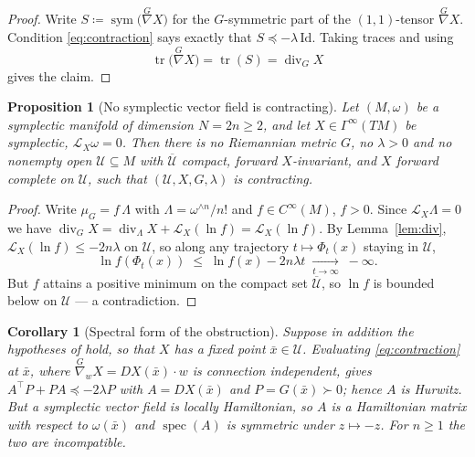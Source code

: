 \documentclass[11pt,a4paper]{article}
\newcommand{\dive}{\operatorname{div}}
\newcommand{\Gsec}[1]{\Gamma^{\infty}(#1)}
\newcommand{\Cinf}[1]{C^{\infty}(#1)}
\newcommand{\id}{\mathrm{Id}}
\newcommand{\Lie}{\mathcal{L}}
\DeclareMathOperator{\spec}{spec}
\DeclareMathOperator{\tr}{tr}
\theoremstyle{plain}
\newtheorem{proposition}[theorem]{Proposition}
\newtheorem{corollary}[theorem]{Corollary}
\theoremstyle{definition}
\theoremstyle{remark}
\begin{document}
\begin{proof}
Write $S \coloneqq \operatorname{sym}\big(\overset{G}{\nabla}X\big)$ for the
$G$-symmetric part of the $(1,1)$-tensor $\overset{G}{\nabla}X$. Condition
\eqref{eq:contraction} says exactly that $S \preceq -\lambda\,\id$. Taking traces
and using
\[
  \tr\big(\overset{G}{\nabla}X\big) = \tr(S) = \dive_G X
\]
gives the claim.
\end{proof}

\begin{proposition}[No symplectic vector field is contracting]
\label{prop:obstruction}
Let $(M,\omega)$ be a symplectic manifold of dimension $N = 2n \ge 2$, and let
$X \in \Gsec{TM}$ be symplectic, $\Lie_X\omega = 0$. Then there is no Riemannian
metric $G$, no $\lambda>0$ and no nonempty open $\mathcal{U} \subseteq M$ with
$\overline{\mathcal{U}}$ compact, forward $X$-invariant, and $X$ forward complete
on $\mathcal{U}$, such that $(\mathcal{U},X,G,\lambda)$ is contracting.
\end{proposition}

\begin{proof}
Write $\mu_G = f\,\Lambda$ with $\Lambda = \omega^{\wedge n}/n!$ and
$f \in \Cinf{M}$, $f>0$. Since $\Lie_X\Lambda = 0$ we have
$\dive_G X = \dive_\Lambda X + \Lie_X(\ln f) = \Lie_X(\ln f)$.
By Lemma~\ref{lem:div}, $\Lie_X(\ln f) \le -2n\lambda$ on $\mathcal{U}$, so along
any trajectory $t \mapsto \Phi_t(x)$ staying in $\mathcal{U}$,
\[
  \ln f(\Phi_t(x)) \;\le\; \ln f(x) - 2n\lambda t \;\xrightarrow[t\to\infty]{}\; -\infty.
\]
But $f$ attains a positive minimum on the compact set $\overline{\mathcal{U}}$,
so $\ln f$ is bounded below on $\mathcal{U}$ --- a contradiction.
\end{proof}

\begin{corollary}[Spectral form of the obstruction]
\label{cor:spectral}
Suppose in addition the hypotheses of \cite[Prop.~2.5(i)]{SB13} hold, so that $X$
has a fixed point $\bar x \in \mathcal{U}$. Evaluating \eqref{eq:contraction} at
$\bar x$, where $\overset{G}{\nabla}_{w}X = DX(\bar x)\cdot w$ is connection
independent, gives
$A^{\!\top}P + PA \preceq -2\lambda P$ with $A = DX(\bar x)$ and
$P = G(\bar x) \succ 0$; hence $A$ is Hurwitz. But a symplectic vector field is
locally Hamiltonian, so $A$ is a Hamiltonian matrix with respect to
$\omega(\bar x)$ and $\spec(A)$ is symmetric under $z \mapsto -z$. For $n \ge 1$
the two are incompatible.
\end{corollary}
\end{document}
